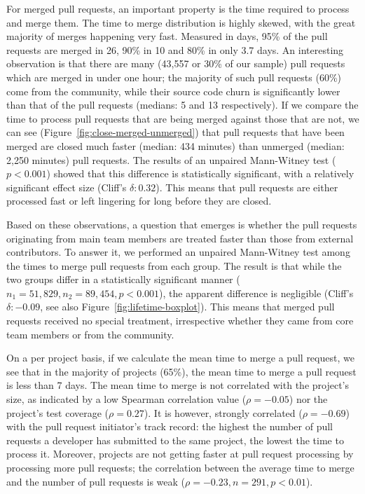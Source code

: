 \documentclass{sig-alternate}
\begin{document}
For merged pull requests, an important property is the time required to process
and merge them. The time to merge distribution is highly skewed, with the great
majority of merges happening very fast. Measured in days, 95\% of the pull
requests are merged in 26, 90\% in 10 and 80\% in only 3.7 days. An interesting
observation is that there are many (43,557 or 30\% of our sample) pull requests
which are merged in under one hour; the majority of such pull requests (60\%)
come from the community, while their source code churn is significantly
lower than that of the pull requests (medians: 5 and 13 respectively). If we compare the time to
process pull requests that are being merged against those that are not, we can
see (Figure~\ref{fig:close-merged-unmerged}) that pull requests that have been
merged are closed much faster (median: 434 minutes) than unmerged (median: 2,250
minutes) pull requests.
The results of an unpaired Mann-Witney test ($p < 0.001$) showed that this difference is statistically significant, with a relatively
significant effect size (Cliff's $\delta: 0.32$). This means that pull requests
are either processed fast or left lingering for long before they are closed.

Based on these observations, a question that emerges is
whether the pull requests originating from main team members are treated faster
than those from external contributors. To answer it, we performed an unpaired
Mann-Witney test among the times to merge pull requests from each group. The
result is that while the two groups differ in a statistically significant manner
($n_1 = 51,829, n_2 = 89,454, p < 0.001$), the apparent difference is negligible
(Cliff's $\delta: -0.09$, see also Figure~\ref{fig:lifetime-boxplot}). This
means that merged pull requests received no special treatment, irrespective
whether they came from core team members or from the community.

On a per project basis, if we calculate the mean time to merge a pull request,
we see that in the majority of projects (65\%), the mean time to merge a pull
request is less than 7 days. The mean time to merge
is not correlated with the project's size, as indicated by a low Spearman
correlation value ($\rho = -0.05$) nor the project's test coverage ($\rho =
0.27$). It is however, strongly correlated ($\rho = -0.69$) with the pull
request initiator's track record: the highest the number of pull requests a
developer has submitted to the same project, the lowest the time to process it.
Moreover, projects are not getting faster at pull request processing by
processing more pull requests; the correlation between the average time to merge
and the number of pull requests is weak ($\rho = -0.23, n = 291, p < 0.01$).
\end{document}
